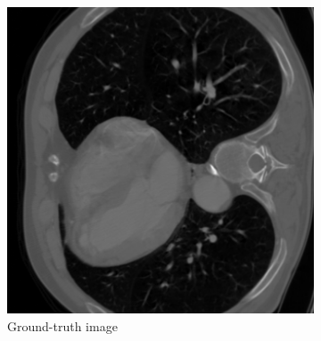 \documentclass[12pt,a4paper]{article}
\begin{document}
 \begin{figure}[h!] %
    \centering %
    \newcommand\size{0.4}
    \begin{subfigure}[t]{\size\textwidth}
        \centering
        \includegraphics[width=\textwidth]{Bachelorthesis/UsedImages/gt_50.png}
        \caption{Ground-truth image} %
        \label{fig:windowII+l2+slow50_gt}
    \end{subfigure}
    \hfill %
    \begin{subfigure}[t]{\size\textwidth}
        \centering

\end{subfigure}
\end{figure}
\end{document}
